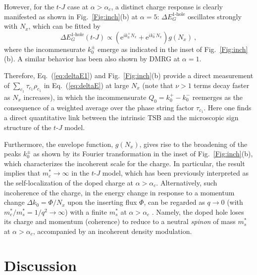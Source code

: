 \documentclass[aps,prb,twocolumn,notitlepage,superscriptaddress,showpacs]{revtex4-1}
\newcommand{\E}{\mathrm{e}}
\begin{document}
However, for the $t$-$J$ case at $\alpha>\alpha_c$, a distinct charge response is clearly manifested as shown in Fig.~\ref{Fig:inch}(b) at $\alpha=5$: $\Delta E_{G}^{\text{1-hole}} $ oscillates strongly with $N_x$, which can be fitted by\cite{Note2}
\begin{equation}\label{eq:deltaE1}
\Delta E_{G}^{\text{1-hole}} (t\text{-}J)  \propto \left(\E^{ik_0^+ N_x}+\E^{ik_0^- N_x}\right) g({N_x})~,
\end{equation}
where the incommensurate $k_0^{\pm}$ emerge as indicated in the inset of Fig.~\ref{Fig:inch}(b). A similar behavior has been also shown by DMRG \cite{ZZ2014cm} at $\alpha=1$.

Therefore, Eq.~(\ref{eq:deltaE1}) and Fig.~\ref{Fig:inch}(b) provide a direct measurement of $\sum_{c_1}  \tau_{c_1} \rho_{c_1}$ in Eq.~(\ref{eq:deltaE}) at large $N_x$ (note that $\nu>1$ terms decay faster as $N_x$ increases), in which the incommensurate $Q_0=k_0^{+}-k_0^{-}$ reemerges as the consequence of a weighted average over the phase string factor $\tau_{c_1}$. Here one finds a direct quantitative link between the intrinsic TSB and the microscopic sign structure of the  $t$-$J$ model.

Furthermore, the envelope function, $g(N_x)$, gives rise to the broadening of the peaks $k_0^{\pm}$ as shown by its Fourier transformation in the inset of Fig.~\ref{Fig:inch}(b), which characterizes the incoherent scale for the charge.
In particular, the result implies that $m^*_c \rightarrow \infty$ in the $t\text{-}J$ model, which has been previously interpreted \cite{ZZ2013,ZZ2014qp,ZZ2014cm} as the self-localization of the doped charge at $\alpha>\alpha_c$. Alternatively, such incoherence of the charge, in the energy change in response to a momentum change $\Delta k_0=\Phi/N_x$ upon the inserting flux $\Phi$, can be regarded as $q\rightarrow 0$ (with $m^*_c/m^*_s=1/q^2\rightarrow \infty$) with a finite $m^*_s$ at $\alpha>\alpha_c$ \cite{ZZ2013,ZZ2014qp,WSK2015}. Namely, the doped hole loses its charge and momentum (coherence) to reduce to a neutral \emph{spinon} of mass $m^*_s$ at $\alpha>\alpha_c$, accompanied by an incoherent density modulation.



\section{Discussion}
\end{document}
